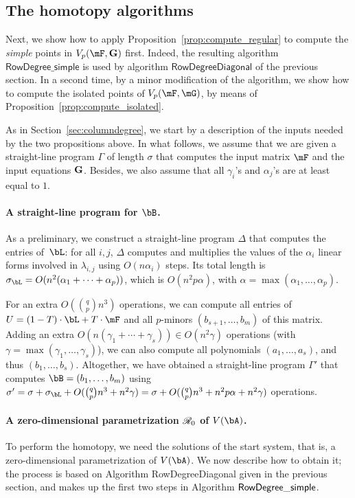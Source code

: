 \documentclass[12pt]{article}
\begin{document}

\subsection{The homotopy algorithms}

Next, we show how to apply Proposition~\ref{prop:compute_regular} to
compute the {\em simple} points in $\VpFG{p}{\mF}{\G}$ first. Indeed, the
resulting algorithm $\mathsf{RowDegree\_simple}$ is used by algorithm
$\mathsf{RowDegreeDiagonal}$ of the previous section. In a second
time, by a minor modification of the algorithm, we show how to compute
the isolated points of $\VpFG{p}{\mF}{\mG}$, by means of
Proposition~\ref{prop:compute_isolated}.

As in Section~\ref{sec:columndegree}, we start by a description of the
inputs needed by the two propositions above. In what follows, we
assume that we are given a straight-line program $\Gamma$ of length
$\sigma$ that computes the input matrix $\mF$ and the input equations
$\mathbf{G}$.  Besides, we also assume that all $\gamma_i$'s and $\alpha_j$'s
are at least equal to $1$.

\paragraph{A straight-line program for $\bB$.} 
As a preliminary, we construct a straight-line program $\Delta$ that
computes the entries of~$\bL$: for all $i,j$, $\Delta$ computes and
multiplies the values of the $\alpha_i$ linear forms involved in
$\lambda_{i,j}$ using $O(n \alpha_i)$ steps. Its total length is
$\sigma_\bL=O(n^2 (\alpha_1+\cdots+\alpha_p))$, which is $O(n^2 p
\alpha)$, with $\alpha = \max(\alpha_1, \ldots, \alpha_p)$.

For an extra $O({q \choose p} n^3)$ operations, we can compute all
entries of $\mU=(1-T)\cdot\bL+T\cdot\mF$ and all $p$-minors
$(b_{s+1},\dots,b_m)$ of this matrix.  Adding an extra $O(n(\gamma_1 +
\cdots + \gamma_s))\in O(n^2 \gamma)$ operations (with $\gamma =
\max(\gamma_1, \ldots, \gamma_s)$), we can also compute all
polynomials $(a_1,\dots,a_s)$, and thus $(b_1,\dots,b_s)$.
Altogether, we have obtained a straight-line program $\Gamma'$ that
computes $\bB=(b_1,\dots,b_m)$ using $\sigma'=\sigma + \sigma_\bL +
O({q \choose p} n^3 + n^2 \gamma)=\sigma +O( {q \choose p} n^3 + n^2 p
\alpha+ n^2\gamma)$ operations.

\paragraph{A zero-dimensional parametrization $\mathscr{R}_0$ of $V(\bA)$.} 
To perform the homotopy, we need the solutions of the start system,
that is, a zero-dimensional parametrization of $V(\bA)$. We now
describe how to obtain it; the process is based on Algorithm {\sf
  RowDegreeDiagonal} given in the previous section, and makes up the
first two steps in Algorithm ${\sf RowDegree\_simple}$.
\end{document}
